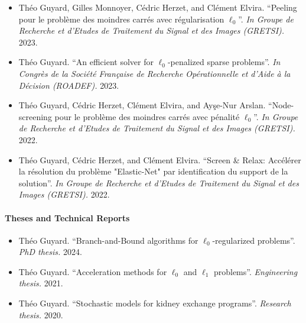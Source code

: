 \begin{itemize}
    \item Théo Guyard, Gilles Monnoyer, Cédric Herzet,  and Clément Elvira. ``Peeling pour le problème des moindres carrés avec régularisation $\ell_0$''. \textit{In Groupe de Recherche et d'Etudes de Traitement du Signal et des Images (GRETSI).} 2023.
    \item Théo Guyard. ``An efficient solver for $\ell_0$-penalized sparse problems''. \textit{In Congrès de la Société Française de Recherche Opérationnelle et d'Aide à la Décision (ROADEF).} 2023.
    \item Théo Guyard, Cédric Herzet, Clément Elvira, and Ay\c{s}e-Nur Arslan. ``Node-screening pour le problème des moindres carrés avec pénalité $\ell_0$''. \textit{In Groupe de Recherche et d'Etudes de Traitement du Signal et des Images (GRETSI).} 2022.
    \item Théo Guyard, Cédric Herzet, and Clément Elvira. ``Screen \& Relax: Accélérer la résolution du problème "Elastic-Net" par identification du support de la solution''. \textit{In Groupe de Recherche et d'Etudes de Traitement du Signal et des Images (GRETSI).} 2022.
\end{itemize}

\paragraph*{Theses and Technical Reports}

\begin{itemize}
    \item Théo Guyard. ``Branch-and-Bound algorithms for $\ell_0$-regularized problems''. \textit{PhD thesis.} 2024.
    \item Théo Guyard. ``Acceleration methods for $\ell_0$ and $\ell_1$ problems''. \textit{Engineering thesis.} 2021.
    \item Théo Guyard. ``Stochastic models for kidney exchange programs''. \textit{Research thesis.} 2020.
\end{itemize}
